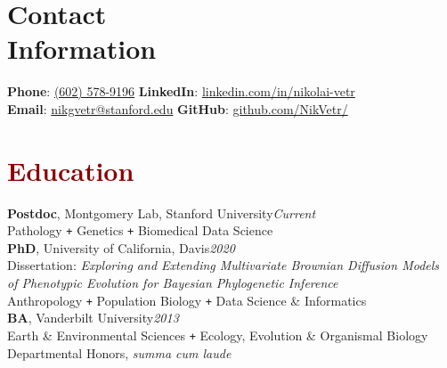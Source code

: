\documentclass[11pt,margin,line]{resume}
\begin{document}
\name{\huge \textcolor{DarkRed}{Nikolai G. Vetr \hfill}}
\begin{resume}
\vspace{-5mm}
\section{\mysidestyle Contact\\Information}
    \textbf{Phone}: \href{tel:+16025789196}{\color{blue}(602) 578-9196}       \hfill \textbf{LinkedIn}: \href{https://www.linkedin.com/in/nikolai-vetr}{\color{blue}linkedin.com/in/nikolai-vetr} \\
\noindent \textbf{Email}: \href{mailto:nikgvetr@stanford.edu}{\color{blue}nikgvetr@stanford.edu}  \hfill \textbf{GitHub}: \href{https://www.github.com/NikVetr/}{\color{blue}github.com/NikVetr/} \vspace{0mm}\\\vspace{-6.5mm}

\section{\large\textcolor{DarkRed}{Education}}

\textbf{Postdoc}, Montgomery Lab, Stanford University\hfill\emph{Current}\\
Pathology \texttt{+} Genetics \texttt{+} Biomedical Data Science
\vspace{-1em}\\

\textbf{PhD}, University of California, Davis\hfill\emph{2020}\\
Dissertation: \textit{Exploring and Extending Multivariate Brownian Diffusion Models\\\hspace*{22mm} of Phenotypic Evolution for Bayesian Phylogenetic Inference}\\
Anthropology \texttt{+} Population Biology \texttt{+} Data Science \& Informatics
\vspace{-1em}\\

\textbf{BA}, Vanderbilt University\hfill\emph{2013}\\
Earth \& Environmental Sciences \texttt{+} Ecology, Evolution \& Organismal Biology\\
Departmental Honors, \textit{summa cum laude}\\
\vspace{-1.5em}


\end{resume}
\end{document}
